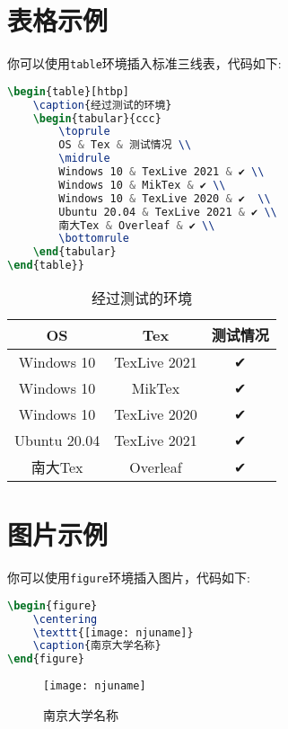 \documentclass[
    TitleLength=1,%
]{njuthesis}
\begin{document}
\section{表格示例}
你可以使用\lstinline|table|环境插入标准三线表，代码如下:
\begin{lstlisting}[language=TeX]
\begin{table}[htbp]
    \caption{经过测试的环境}
    \begin{tabular}{ccc}
        \toprule
        OS & Tex & 测试情况 \\
        \midrule
        Windows 10 & TexLive 2021 & ✔ \\
        Windows 10 & MikTex & ✔ \\
        Windows 10 & TexLive 2020 & ✔  \\
        Ubuntu 20.04 & TexLive 2021 & ✔ \\
        南大Tex & Overleaf & ✔ \\
        \bottomrule
    \end{tabular}
\end{table}}
\end{lstlisting}
\begin{table}[htbp]
    \caption{经过测试的环境}
    \begin{tabular}{ccc}
        \toprule
        OS & Tex & 测试情况 \\
        \midrule
        Windows 10 & TexLive 2021 & ✔ \\
        Windows 10 & MikTex & ✔ \\
        Windows 10 & TexLive 2020 & ✔  \\
        Ubuntu 20.04 & TexLive 2021 & ✔ \\
        南大Tex & Overleaf & ✔ \\
        \bottomrule
    \end{tabular}
\end{table}

\section{图片示例}
你可以使用\lstinline|figure|环境插入图片，代码如下:
\begin{lstlisting}[language=TeX]
\begin{figure}
    \centering
    \texttt{[image: njuname]}
    \caption{南京大学名称}
\end{figure}
\end{lstlisting}
\begin{figure}[htbp]
\centering
\texttt{[image: njuname]}
\caption{南京大学名称}
\end{figure}
\end{document}
